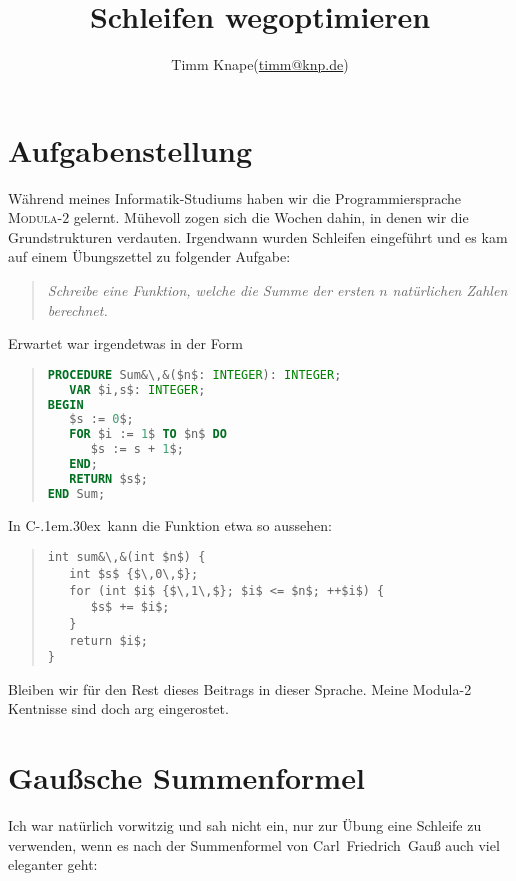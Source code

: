 \documentclass[a5paper,landscape,ngerman,10pt]{article}
\title{Schleifen wegoptimieren}
\author{Timm Knape\quad(\href{mailto:timm@knp.de}{timm@knp.de})}
\begin{document}
\newcommand{\cpp}{C\kern-.1em\raise.30ex\hbox{\smaller{++}}}
\lstset{
  columns=fullflexible,
  language=[11]C++,
  mathescape=true,
  escapechar=\&
}
%
\maketitle
%
\section{Aufgabenstellung}
%
Während meines Informatik-Studiums haben wir die
Programmiersprache \hbox{\textsc{Modula-$2$}} gelernt.
Mühevoll zogen sich die Wochen dahin, in denen wir die
Grundstrukturen verdauten.
Irgendwann wurden Schleifen eingeführt und es kam auf
einem Übungszettel zu folgender Aufgabe:

\begin{quotation}
\textit{Schreibe eine Funktion, welche die 
Summe der ersten $n$ natürlichen Zahlen berechnet.}
\end{quotation}

Erwartet war irgendetwas in der Form

\begin{quotation}
\begin{lstlisting}[language=Modula-2, morekeywords={TO}]
PROCEDURE Sum&\,&($n$: INTEGER): INTEGER;
   VAR $i,s$: INTEGER;
BEGIN
   $s := 0$;
   FOR $i := 1$ TO $n$ DO
      $s := s + 1$;
   END;
   RETURN $s$;
END Sum;
\end{lstlisting}
\end{quotation}

In \cpp\ kann die Funktion etwa so aussehen:

\begin{quotation}
\begin{lstlisting}
int sum&\,&(int $n$) {
   int $s$ {$\,0\,$};
   for (int $i$ {$\,1\,$}; $i$ <= $n$; ++$i$) {
      $s$ += $i$;
   }
   return $i$;
}
\end{lstlisting}
\end{quotation}

Bleiben wir für den Rest dieses Beitrags in dieser Sprache.
Meine Modula-2 Kentnisse sind doch arg eingerostet.

\section{Gaußsche Summenformel}

Ich war natürlich vorwitzig und sah nicht ein,
nur zur Übung eine Schleife zu verwenden,
wenn es nach der Summenformel von Carl~Friedrich~Gauß auch viel eleganter
geht:
\end{document}
